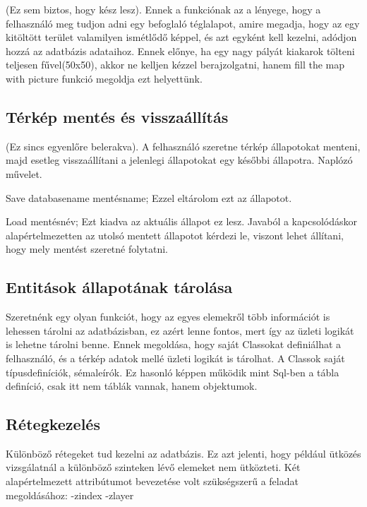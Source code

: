 \begin{sql}
(Ez sem biztos, hogy kész lesz).  Ennek a funkciónak az a lényege, hogy a felhasználó meg tudjon adni egy befoglaló téglalapot, amire megadja, hogy az egy kitöltött terület valamilyen ismétlődő képpel, és azt egyként kell kezelni, adódjon hozzá az adatbázis adataihoz. Ennek előnye, ha egy nagy pályát kiakarok tölteni teljesen fűvel(50x50), akkor ne kelljen kézzel berajzolgatni, hanem fill the map with picture funkció megoldja ezt helyettünk.

\subsection{Térkép mentés és visszaállítás}

(Ez sincs egyenlőre belerakva). A felhasználó szeretne térkép állapotokat menteni, majd esetleg visszaállítani a jelenlegi állapotokat egy későbbi állapotra. Naplózó művelet.

Save databasename mentésname;
Ezzel eltárolom ezt az állapotot.

Load mentésnév;
Ezt kiadva az aktuális állapot ez lesz. Javaból a kapcsolódáskor alapértelmezetten az utolsó mentett állapotot kérdezi le, viszont lehet állítani, hogy mely mentést szeretné folytatni.

\subsection{Entitások állapotának tárolása}

Szeretnénk egy olyan funkciót, hogy az egyes elemekről több információt is lehessen tárolni az adatbázisban, ez azért lenne fontos, mert így az üzleti logikát is lehetne tárolni benne. Ennek megoldása, hogy saját Classokat definiálhat a felhasználó, és a térkép adatok mellé üzleti logikát is tárolhat. A Classok saját típusdefiníciók, sémaleírók. Ez hasonló képpen működik mint Sql-ben a tábla definíció, csak itt nem táblák vannak, hanem objektumok.

\subsection{Rétegkezelés}

Különböző rétegeket tud kezelni az adatbázis. Ez azt jelenti, hogy például ütközés vizsgálatnál a különböző szinteken lévő elemeket nem ütközteti. Két alapértelmezett attribútumot bevezetése volt szükségszerű a feladat megoldásához:
-zindex
-zlayer


\end{sql}
